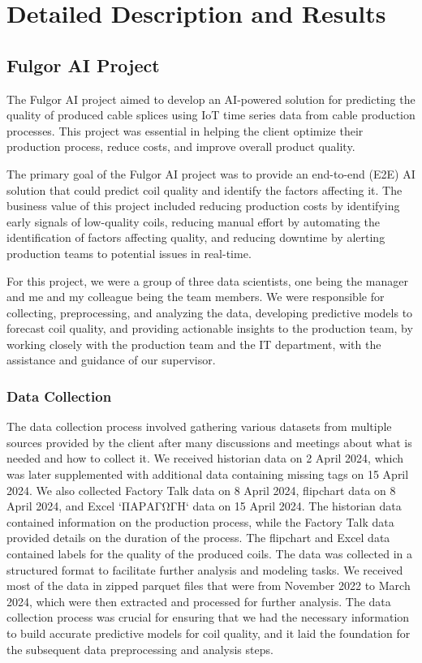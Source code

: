 \chapter{Detailed Description and Results}
\label{sec:results-int}

\section{Fulgor AI Project}

The Fulgor AI project aimed to develop an AI-powered solution for predicting
the quality of produced cable splices using IoT time series data from cable
production processes. This project was essential in helping the client optimize
their production process, reduce costs, and improve overall product quality.

The primary goal of the Fulgor AI project was to provide an end-to-end (E2E) AI
solution that could predict coil quality and identify the factors affecting it.
The business value of this project included reducing production costs by
identifying early signals of low-quality coils, reducing manual effort by
automating the identification of factors affecting quality, and reducing
downtime by alerting production teams to potential issues in real-time.

For this project, we were a group of three data scientists, one being the
manager and me and my colleague being the team members. We were responsible for
collecting, preprocessing, and analyzing the data, developing predictive models
to forecast coil quality, and providing actionable insights to the production
team, by working closely with the production team and the IT department, with
the assistance and guidance of our supervisor.

\subsection{Data Collection}

The data collection process involved gathering various datasets from multiple
sources provided by the client after many discussions and meetings about what
is needed and how to collect it. We received historian data on 2 April 2024,
which was later supplemented with additional data containing missing tags on 15
April 2024. We also collected Factory Talk data on 8 April 2024, flipchart data
on 8 April 2024, and Excel `ΠΑΡΑΓΩΓΗ` data on 15 April 2024. The historian data
contained information on the production process, while the Factory Talk data
provided details on the duration of the process. The flipchart and Excel data
contained labels for the quality of the produced coils. The data was collected
in a structured format to facilitate further analysis and modeling tasks. We
received most of the data in zipped parquet files that were from November 2022
to March 2024, which were then extracted and processed for further analysis.
The data collection process was crucial for ensuring that we had the necessary
information to build accurate predictive models for coil quality, and it laid
the foundation for the subsequent data preprocessing and analysis steps.

